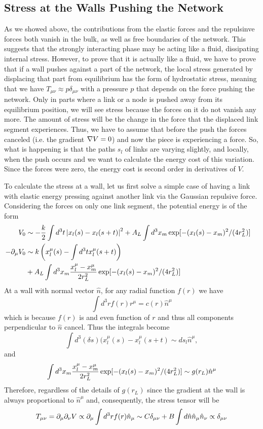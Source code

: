 \documentclass[nofootinbib,preprint,floatfix,titlepage,superscriptaddress]{revtex4} %
\begin{document}
\subsection{Stress at the Walls Pushing the Network}
As we showed above, the contributions from the elastic forces and the repulsinve forces both vanish in the bulk, as well as free boundaries of the network. This suggests that the strongly interacting phase may be acting like a fluid, dissipating internal stress. 
However, to prove that it is actually like a fluid, we have to prove that if a wall pushes against a part of the network, the local stress generated by displacing that part from equilibrium has the form of hydrostatic stress, meaning that we have $T_{\mu\nu} \approx p \delta_{\mu\nu}$ with a pressure $p$ that depends on the force pushing the network. 
Only in parts where a link or a node is pushed away from its equilibrium position, we will see stress because the forces on it do not vanish any more.
The amount of stress will be the change in the force that the displaced link segment experiences.
Thus, we have to assume that before the push the forces canceled (i.e. the gradient $\nabla V = 0$) and now the piece is experiencing a force. 
So, what is happening is that the paths $s_l$ of links are varying slightly, and locally, when the push occurs and we want to calculate the energy cost of this variation.
Since the forces were zero, the energy cost is second order in derivatives of $V$. 

To calculate the stress at a wall, let us first solve a simple case of having a link with elastic energy pressing against another link via the Gaussian repulsive force. 
Considering the forces on only one link segment, the potential energy is of the form
\begin{align}
    V_0 &\sim -{k\over 2} \int d^3t \left|x_l(s)- x_l(s+t)\right|^2 + A_L \int d^3 x_m \exp[-(x_l(s) - x_m)^2/ (4r_L^2)]   \cr 
    -\partial_\mu V_0 & \sim k \left(x_l^\mu(s)- \int d^3t x^\mu_l(s+t)\right) \cr & + A_L \int d^3 x_m {x_l^\mu-x_m^\mu  \over 2r_L^2} \exp[-(x_l(s) - x_m)^2/ (4r_L^2)]
\end{align}
At a wall with normal vector $\hat{n}$, for any radial function $f(r)$ we have 
\[\int d^3 r f(r) r^\mu = c(r) \hat{n}^\mu \]
which is because $f(r) $ is and even function of $r$ and thus all components perpendicular to $\hat{n}$ cancel. 
Thus the integrals become 
\[\int d^3(\delta s) (x_l^\mu (s) - x^\mu_l(s+t) \sim ds_l\hat{n}^\mu,\]
and  
\[\int d^3 x_m {x_l^\mu-x_m^\mu  \over 2r_L^2} \exp[-(x_l(s) - x_m)^2/ (4r_L^2)] \sim g(r_L) \hat{n}^\mu  \]
Therefore, regardless of the details of $g(r_L)$ since the gradient at the wall is always proportional to $\hat{n}^\mu $ and, consequently, the stress tensor will be 
\[T_{\mu\nu} = \partial_\mu\partial_\nu V \propto \partial_\mu \int d^3r f(r)\hat{n}_\mu \sim C \delta_{\mu\nu} + B\int d\hat{n} \hat{n}_\mu \hat{n}_\nu \propto \delta_{\mu\nu} \]
\end{document}
